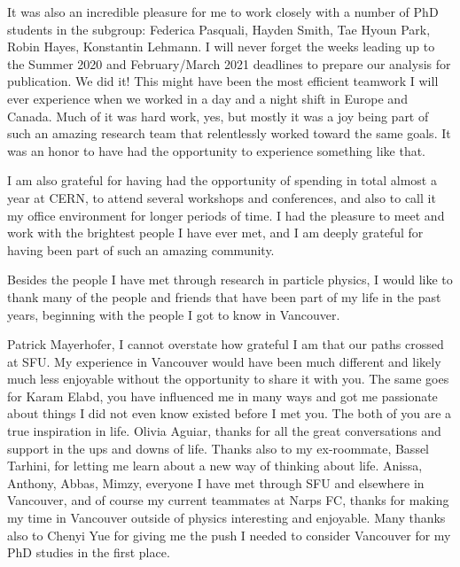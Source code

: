 It was also an incredible pleasure for me to work closely with a number of PhD students in the \HWW subgroup: 
Federica Pasquali, Hayden Smith, Tae Hyoun Park, Robin Hayes, Konstantin Lehmann. 
I will never forget the weeks leading up to the Summer 2020 and February/March 2021 deadlines to prepare our analysis for publication. We did it!
This might have been the most efficient teamwork I will ever experience when we worked in a day and a night shift in Europe and Canada. 
Much of it was hard work, yes, but mostly it was a joy being part of such an amazing research team that relentlessly worked toward the same goals. It was an honor to have had the opportunity to experience something like that. 

I am also grateful for having had the opportunity of spending in total almost a year at CERN, to attend several workshops and conferences, and also to call it my office environment for longer periods of time. 
I had the pleasure to meet and work with the brightest people I have ever met, and I am deeply grateful for having been part of such an amazing community. 

Besides the people I have met through research in particle physics, I would like to thank many of the people and friends that have been part of my life in the past years, beginning with the people I got to know in Vancouver. 

Patrick Mayerhofer, I cannot overstate how grateful I am that our paths crossed at SFU. My experience in Vancouver would have been much different and likely much less enjoyable without the opportunity to share it with you.
The same goes for Karam Elabd, you have influenced me in many ways and got me passionate about things I did not even know existed before I met you. The both of you are a true inspiration in life.
Olivia Aguiar, thanks for all the great conversations and support in the ups and downs of life. 
Thanks also to my ex-roommate, Bassel Tarhini, for letting me learn about a new way of thinking about life. 
Anissa, Anthony, Abbas, Mimzy, everyone I have met through SFU and elsewhere in Vancouver, and of course my current teammates at Narps FC, thanks for making my time in Vancouver outside of physics interesting and enjoyable. 
Many thanks also to Chenyi Yue for giving me the push I needed to consider Vancouver for my PhD studies in the first place. 

